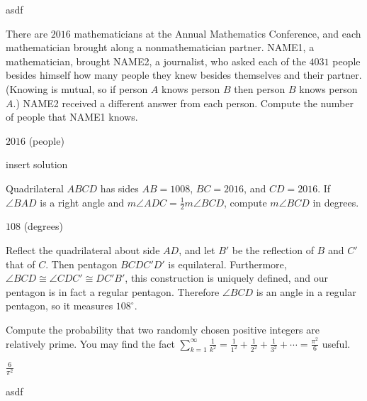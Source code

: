 \documentclass[11pt]{article}
\begin{document}
\begin{answer}

\end{answer}

\begin{solution}
asdf
\end{solution}

\begin{problem}
There are $2016$ mathematicians at the Annual Mathematics Conference, and each mathematician brought along a nonmathematician partner. NAME1, a mathematician, brought NAME2, a journalist, who asked each of the $4031$ people besides himself how many people they knew besides themselves and their partner. (Knowing is mutual, so if person $A$ knows person $B$ then person $B$ knows person $A$.) NAME2 received a different answer from each person. Compute the number of people that NAME1 knows.
\end{problem}

\begin{answer}
$\boxed{2016}$ (people)
\end{answer}

\begin{solution}
insert solution
\end{solution}


\begin{problem}%
Quadrilateral $ABCD$ has sides $AB = 1008$, $BC = 2016$, and $CD = 2016$. If $\angle BAD$ is a right angle and $m\angle ADC = \frac{1}{2}m\angle BCD$, compute $m\angle BCD$ in degrees.
\end{problem}

\begin{answer}
$\boxed{108}$ (degrees)
\end{answer}

\begin{solution}
Reflect the quadrilateral about side $AD$, and let $B'$ be the reflection of $B$ and $C'$ that of $C$. Then pentagon $BCDC'D'$ is equilateral. Furthermore, $\angle BCD \cong \angle CDC' \cong DC'B'$, this construction is uniquely defined, and our pentagon is in fact a regular pentagon. Therefore $\angle BCD$ is an angle in a regular pentagon, so it measures $\boxed{108^\circ}$.
\end{solution}


\begin{problem}
Compute the probability that two randomly chosen positive integers are relatively prime. You may find the fact $\sum\limits_{k = 1}^\infty \frac{1}{k^2} = \frac{1}{1^2} + \frac{1}{2^2} + \frac{1}{3^2} + \cdots = \frac{\pi^2}{6}$ useful.
\end{problem}

\begin{answer}
$\boxed{\frac{6}{\pi^2}}$
\end{answer}

\begin{solution}
asdf
\end{solution}
\end{document}
